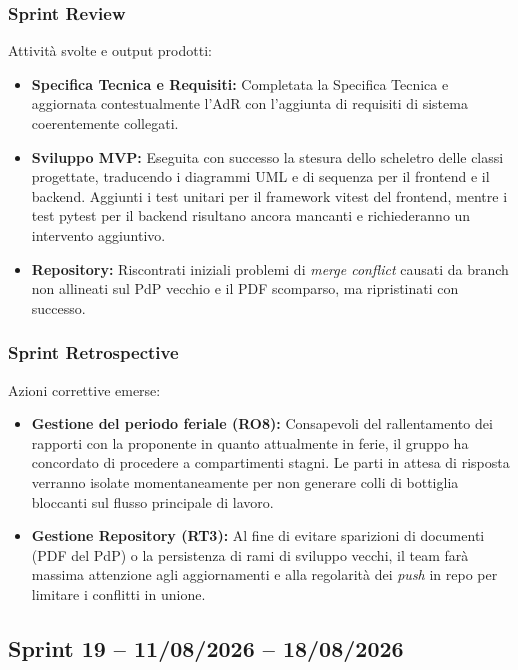\subsubsection{Sprint Review}
Attività svolte e output prodotti:
\begin{itemize}
    \item \textbf{Specifica Tecnica e Requisiti:} Completata la Specifica Tecnica e aggiornata contestualmente l'AdR con l'aggiunta di requisiti di sistema coerentemente collegati.
    \item \textbf{Sviluppo MVP:} Eseguita con successo la stesura dello scheletro delle classi progettate, traducendo i diagrammi UML e di sequenza per il frontend e il backend. Aggiunti i test unitari per il framework vitest del frontend, mentre i test pytest per il backend risultano ancora mancanti e richiederanno un intervento aggiuntivo.
    \item \textbf{Repository:} Riscontrati iniziali problemi di \textit{merge conflict} causati da branch non allineati sul PdP vecchio e il PDF scomparso, ma ripristinati con successo.
\end{itemize}

\subsubsection{Sprint Retrospective}
Azioni correttive emerse:
\begin{itemize}
    \item \textbf{Gestione del periodo feriale (RO8):} Consapevoli del rallentamento dei rapporti con la proponente in quanto attualmente in ferie, il gruppo ha concordato di procedere a compartimenti stagni. Le parti in attesa di risposta verranno isolate momentaneamente per non generare colli di bottiglia bloccanti sul flusso principale di lavoro.
    \item \textbf{Gestione Repository (RT3):} Al fine di evitare sparizioni di documenti (PDF del PdP) o la persistenza di rami di sviluppo vecchi, il team farà massima attenzione agli aggiornamenti e alla regolarità dei \textit{push} in repo per limitare i conflitti in unione.
\end{itemize}

\subsection{Sprint 19 -- 11/08/2026 -- 18/08/2026}
\label{sec:sprint19}

